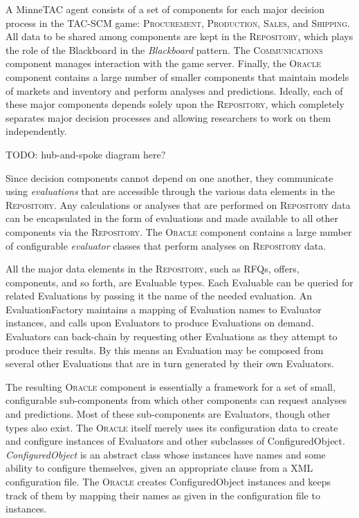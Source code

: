 \documentclass{article}
\begin{document}
A MinneTAC agent consists of a set of components for each major decision process in the TAC-SCM game:  \textsc{Procurement}, \textsc{Production}, \textsc{Sales}, and \textsc{Shipping}.
All data to be shared among components are kept in the \textsc{Repository}, which plays the role of the Blackboard in the \emph{Blackboard} pattern\cite{Busch96}.
The \textsc{Communications} component manages interaction with the game server.
Finally, the \textsc{Oracle} component contains a large number of smaller components that maintain models of markets and inventory and perform analyses and predictions.
Ideally, each of these major components depends solely upon the \textsc{Repository}, which completely separates major decision processes and allowing researchers to work on them independently.

TODO:  hub-and-spoke diagram here?

Since decision components cannot depend on one another, they communicate using \emph{evaluations} that are accessible through the various data elements in the \textsc{Repository}.
Any calculations or analyses that are performed on \textsc{Repository} data can be encapsulated in the form of evaluations and made available to all other components via the \textsc{Repository}.
The \textsc{Oracle} component contains a large number of configurable \emph{evaluator} classes that perform analyses on \textsc{Repository} data.

All the major data elements in the \textsc{Repository}, such as RFQs, offers, components, and so forth, are Evaluable types.
Each Evaluable can be queried for related Evaluations by passing it the name of the needed evaluation.
An EvaluationFactory maintains a mapping of Evaluation names to Evaluator instances, and calls upon Evaluators to produce Evaluations on demand.
Evaluators can back-chain by requesting other Evaluations as they attempt to produce their results.
By this means an Evaluation may be composed from several other Evaluations that are in turn generated by their own Evaluators.

The resulting \textsc{Oracle} component is essentially a framework for a set of small, configurable sub-components from which other components can request analyses and predictions.
Most of these sub-components are Evaluators, though other types also exist.
The \textsc{Oracle} itself merely uses its configuration data to create and configure instances of Evaluators and other subclasses of ConfiguredObject.
\emph{ConfiguredObject} is an abstract class whose instances have names and some ability to configure themselves, given an appropriate clause from a XML configuration file.
The \textsc{Oracle} creates ConfiguredObject instances and keeps track of them by mapping their names as given in the configuration file to instances.
\end{document}
